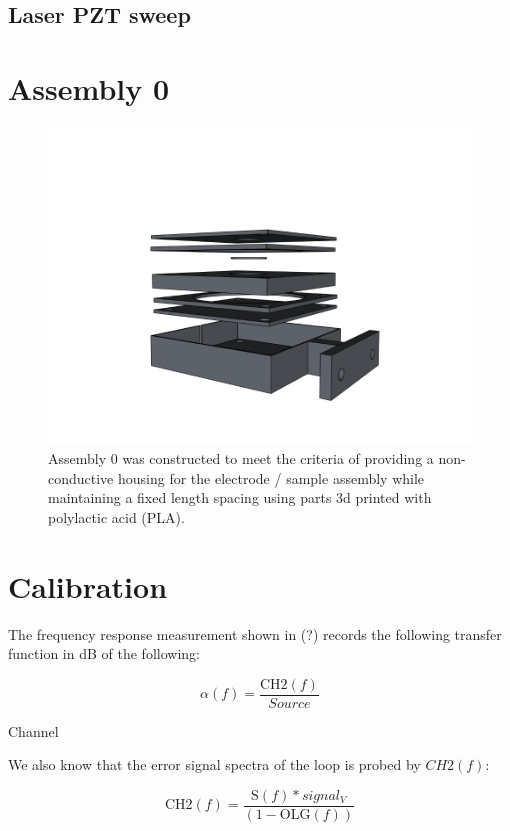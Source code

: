\subsection{Laser PZT sweep}



\section{Assembly 0}
\begin{figure}[H]
\centering
\includegraphics[width=.75\textwidth]{figs/ALGAAS/assemblies/assembly0/assembly0.png}
\caption{Assembly 0 was constructed to meet the criteria of providing a non-conductive housing for the electrode / sample assembly while maintaining a fixed length spacing using parts 3d printed with polylactic acid (PLA).}
\label{fig:Ez}
\end{figure}


\section{Calibration}\label{sec:calibration_math}
The frequency response measurement shown in (?) records the following transfer function in dB of the following:

\begin{equation}
\alpha(f) = \frac{\mathrm{CH2}(f)}{Source}
\end{equation}

Channel

We also know that the error signal spectra of the loop is probed by $CH2(f)$:


\begin{equation}
\mathrm{CH2}(f) = \frac{\mathrm{S}(f)*signal_V}{(1-\mathrm{OLG}(f))}
\end{equation}

